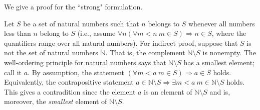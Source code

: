 \documentclass[12pt]{article}
\begin{document}
We give a proof for the ``strong" formulation.

Let $S$ be a set of natural numbers such that $n$ belongs to $S$ whenever all numbers less than $n$ belong to $S$ (i.e., assume $\forall n(\forall m<n\ m\in S)\Rightarrow n\in S$, where the quantifiers range over all natural numbers). For indirect proof, suppose that $S$ is not the set of natural numbers $\mathbb{N}$. That is, the complement $\mathbb{N}\setminus S$ is nonempty.  The well-ordering principle for natural numbers says that $\mathbb{N}\setminus S$ has a smallest element; call it $a$. By assumption, the statement $(\forall m<a\ m\in S)\Rightarrow a\in S$ holds. Equivalently, the contrapositive statement $a\in \mathbb{N}\setminus S \Rightarrow \exists m<a\ m\in \mathbb{N}\setminus S$ holds. This gives a contradition since the element $a$ is an element of $\mathbb{N}\setminus S$ and is, moreover, the \emph{smallest} element of $\mathbb{N}\setminus S$.
\end{document}
